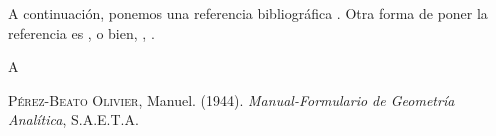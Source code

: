 \documentclass[
  fecha={5 de agosto de 2025},
  palabrasclave={RetoSecundaria, ago2025, álgebra, dif1},
  codigo=minted
]{RetoMatematico}
\begin{document}
A continuación, ponemos una referencia bibliográfica \cite[véase][p. 25]{beato1944}. Otra forma de poner la referencia es \citet[p. 25]{beato1944}, o bien, \citeauthor{beato1944}, \citeyear[p. 25]{beato1944}.


\begin{thebibliography}{A}

 \textsc{Pérez-Beato Olivier}, Manuel. (1944). \textit{Manual-Formulario de Geometría Analítica}, S.A.E.T.A.

\end{thebibliography}
\end{document}
